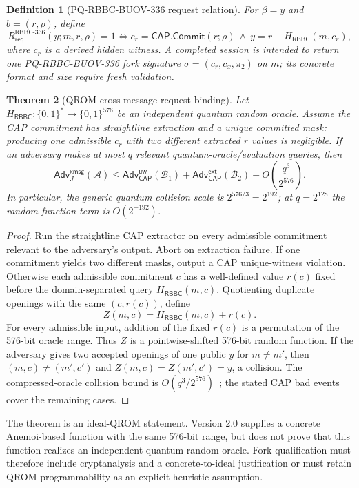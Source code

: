 \documentclass[11pt]{article}
\newtheorem{definition}{Definition}[section]
\newtheorem{theorem}[definition]{Theorem}
\newcommand{\RBBC}{\mathsf{RBBC}}
\newcommand{\Adv}{\mathsf{Adv}}
\begin{document}
\begin{definition}[PQ-RBBC-BUOV-336 request relation]\label{def:rrbs}
For $\beta=y$ and $b=(r,\rho)$, define
\[
 R^{\RBBC\text{-}336}_{\mathsf{req}}(y;m,r,\rho)=1
 \Longleftrightarrow
 c_r=\mathsf{CAP.Commit}(r;\rho)\ \wedge\
 y=r+H_{\RBBC}(m,c_r),
\]
where $c_r$ is a derived hidden witness.  A completed session is intended to
return one PQ-RBBC-BUOV-336 fork signature
$\sigma=(c_r,c_x,\pi_2)$ on $m$; its concrete format and size require fresh
validation.
\end{definition}

\begin{theorem}[QROM cross-message request binding]\label{thm:j-qrom}
Let $H_{\RBBC}:\{0,1\}^*\rightarrow\{0,1\}^{576}$ be an independent quantum
random oracle.  Assume the CAP commitment has straightline extraction and a
unique committed mask: producing one admissible $c_r$ with two different
extracted $r$ values is negligible.  If an adversary makes at most $q$ relevant
quantum-oracle/evaluation queries, then
\[
 \Adv^{\mathsf{xmsg}}_{J}(\mathcal A)
 \leq
 \Adv^{\mathsf{uw}}_{\mathsf{CAP}}(\mathcal B_1)
 +\Adv^{\mathsf{ext}}_{\mathsf{CAP}}(\mathcal B_2)
 +O\!\left(\frac{q^3}{2^{576}}\right).
\]
In particular, the generic quantum collision scale is $2^{576/3}=2^{192}$;
at $q=2^{128}$ the random-function term is $O(2^{-192})$.
\end{theorem}

\begin{proof}
Run the straightline CAP extractor on every admissible commitment relevant to
the adversary's output.  Abort on extraction failure.  If one commitment yields
two different masks, output a CAP unique-witness violation.  Otherwise each
admissible commitment $c$ has a well-defined value $r(c)$ fixed before the
domain-separated query $H_{\RBBC}(m,c)$.  Quotienting duplicate openings with
the same $(c,r(c))$, define
\[
 Z(m,c)=H_{\RBBC}(m,c)+r(c).
\]
For every admissible input, addition of the fixed $r(c)$ is a permutation of
the 576-bit oracle range.  Thus $Z$ is a pointwise-shifted 576-bit random
function.  If the adversary gives two accepted openings of one public $y$ for
$m\neq m'$, then $(m,c)\neq(m',c')$ and
$Z(m,c)=Z(m',c')=y$, a collision.  The compressed-oracle collision bound is
$O(q^3/2^{576})$~\cite{compressed-oracle}; the stated CAP bad events cover the
remaining cases.
\end{proof}

The theorem is an ideal-QROM statement.  Version 2.0 supplies a concrete
Anemoi-based function with the same 576-bit range, but does not prove that this
function realizes an independent quantum random oracle.  Fork qualification
must therefore include cryptanalysis and a concrete-to-ideal justification or
must retain QROM programmability as an explicit heuristic assumption.
\end{document}
